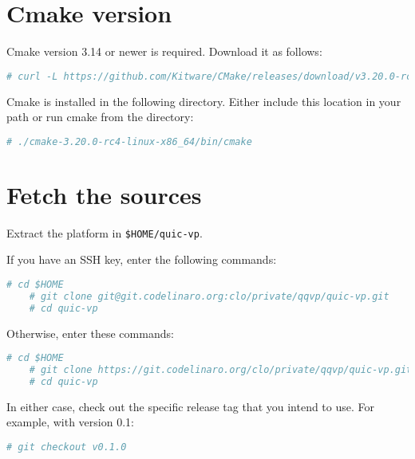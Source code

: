 \section{Cmake version}

Cmake version 3.14 or newer is required. Download it as follows:

\small
\begin{lstlisting}[language=bash]
    # curl -L https://github.com/Kitware/CMake/releases/download/v3.20.0-rc4/cmake-3.20.0-rc4-linux-x86_64.tar.gz | tar -zxf -
\end{lstlisting}
\normalsize

Cmake is installed in the following directory. Either include this location in your path or run cmake from the directory:

\small
\begin{lstlisting}[language=bash]
    # ./cmake-3.20.0-rc4-linux-x86_64/bin/cmake
\end{lstlisting}
\normalsize


\clearpage
\section{Fetch the sources}

Extract the platform in {\small{\lstinline!$HOME/quic-vp!}}.

If you have an SSH key, enter the following commands:

\small
\begin{lstlisting}[language=bash]
    # cd $HOME
    # git clone git@git.codelinaro.org:clo/private/qqvp/quic-vp.git
    # cd quic-vp
\end{lstlisting}
\normalsize

Otherwise, enter these commands:

\small
\begin{lstlisting}[language=bash]
    # cd $HOME
    # git clone https://git.codelinaro.org/clo/private/qqvp/quic-vp.git
    # cd quic-vp
\end{lstlisting}
\normalsize

In either case, check out the specific release tag that you intend to use. For example, with version 0.1:

\small
\begin{lstlisting}[language=bash]
    # git checkout v0.1.0
\end{lstlisting}
\normalsize


